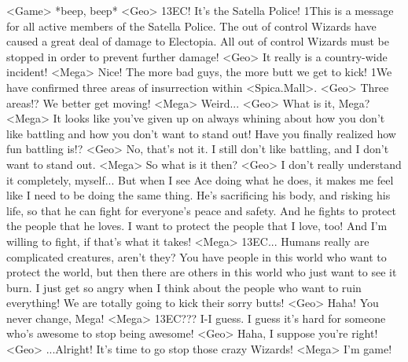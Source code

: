<Game> *beep, beep* 
<Geo> {13}{EC}! 
It's the Satella Police! 
1This is a message for all active members of the Satella Police. 
The out of control Wizards have caused a great deal of damage to Electopia. 
All out of control Wizards must be stopped in order to prevent further damage! 
<Geo> It really is a country-wide incident! 
<Mega> Nice! The more bad guys, the more butt we get to kick! 
1We have confirmed three areas of insurrection within <Spica.Mall>. 
<Geo> Three areas!? We better get moving! 
<Mega> Weird... 
<Geo> What is it, Mega? 
<Mega> It looks like you've given up on always whining about how 
you don't like battling and how you don't want to stand out! 
Have you finally realized how fun battling is!? 
<Geo> No, that's not it. 
I still don't like battling, and I don't want to stand out. 
<Mega> So what is it then? 
<Geo> I don't really understand it completely, myself... 
But when I see Ace doing what he does, it makes me 
feel like I need to be doing the same thing. 
He's sacrificing his body, and risking his life, so that 
he can fight for everyone's peace and safety. 
And he fights to protect the people that he loves. 
I want to protect the people that I love, too! 
And I'm willing to fight, if that's what it takes! 
<Mega> {13}{EC}... 
Humans really are complicated creatures, aren't they? 
You have people in this world who want to protect 
the world, but then there are others in this world who just want to see it burn. 
I just get so angry when I think about the people who want to ruin everything! 
We are totally going to kick their sorry butts! 
<Geo> Haha! You never change, Mega! 
<Mega> {13}{EC}??? 
I-I guess. 
I guess it's hard for someone who's awesome to stop being awesome! 
<Geo> Haha, I suppose you're right! 
<Geo> ...Alright! It's time to go stop those crazy Wizards! 
<Mega> I'm game! 
